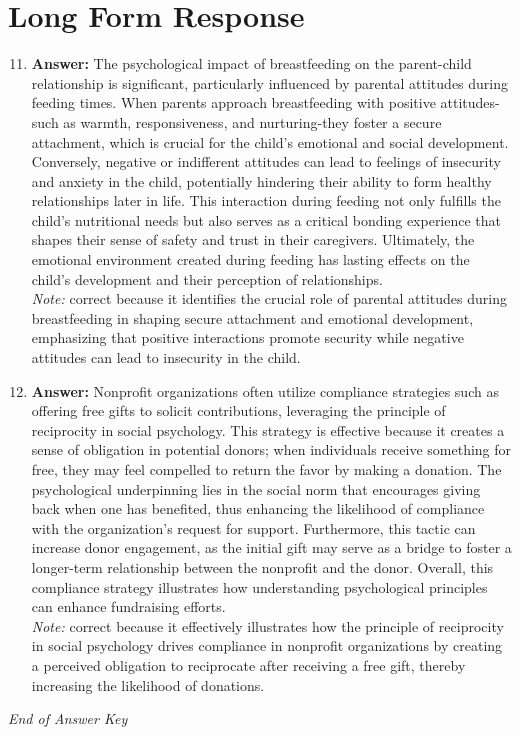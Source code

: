 \documentclass[12pt]{article}
\begin{document}
\section*{Long Form Response}
\begin{enumerate}[label=\arabic*.]
\setcounter{enumi}{10}
\item \textbf{Answer:} The psychological impact of breastfeeding on the parent-child relationship is significant, particularly influenced by parental attitudes during feeding times. When parents approach breastfeeding with positive attitudes-such as warmth, responsiveness, and nurturing-they foster a secure attachment, which is crucial for the child's emotional and social development. Conversely, negative or indifferent attitudes can lead to feelings of insecurity and anxiety in the child, potentially hindering their ability to form healthy relationships later in life. This interaction during feeding not only fulfills the child's nutritional needs but also serves as a critical bonding experience that shapes their sense of safety and trust in their caregivers. Ultimately, the emotional environment created during feeding has lasting effects on the child's development and their perception of relationships.
\\ \textit{Note:} correct because it identifies the crucial role of parental attitudes during breastfeeding in shaping secure attachment and emotional development, emphasizing that positive interactions promote security while negative attitudes can lead to insecurity in the child.
\item \textbf{Answer:} Nonprofit organizations often utilize compliance strategies such as offering free gifts to solicit contributions, leveraging the principle of reciprocity in social psychology. This strategy is effective because it creates a sense of obligation in potential donors; when individuals receive something for free, they may feel compelled to return the favor by making a donation. The psychological underpinning lies in the social norm that encourages giving back when one has benefited, thus enhancing the likelihood of compliance with the organization's request for support. Furthermore, this tactic can increase donor engagement, as the initial gift may serve as a bridge to foster a longer-term relationship between the nonprofit and the donor. Overall, this compliance strategy illustrates how understanding psychological principles can enhance fundraising efforts.
\\ \textit{Note:} correct because it effectively illustrates how the principle of reciprocity in social psychology drives compliance in nonprofit organizations by creating a perceived obligation to reciprocate after receiving a free gift, thereby increasing the likelihood of donations.
\end{enumerate}

\vfill
\noindent\textit{End of Answer Key}
\end{document}

